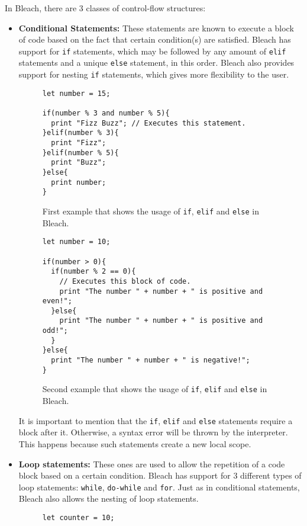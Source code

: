 In Bleach, there are 3 classes of control-flow structures:
\begin{itemize}
    \item \textbf{Conditional Statements:} These statements are known to execute a block of code based on the fact that certain condition(s) are satisfied. Bleach has support for \texttt{if} statements, which may be followed by any amount of \texttt{elif} statements and a unique \texttt{else} statement, in this order. Bleach also provides support for nesting \texttt{if} statements, which gives more flexibility to the user.
\begin{figure}[H]
    \centering
    \begin{lstlisting}
let number = 15;

if(number % 3 and number % 5){
  print "Fizz Buzz"; // Executes this statement.
}elif(number % 3){
  print "Fizz";
}elif(number % 5){
  print "Buzz";
}else{
  print number;
}
    \end{lstlisting}
    \caption{First example that shows the usage of \texttt{if}, \texttt{elif} and \texttt{else} in Bleach.}
\end{figure}

\begin{figure}[H]
    \centering
    \begin{lstlisting}
let number = 10;

if(number > 0){
  if(number % 2 == 0){
    // Executes this block of code.
    print "The number " + number + " is positive and even!";
  }else{
    print "The number " + number + " is positive and odd!";
  }
}else{
  print "The number " + number + " is negative!";
}
    \end{lstlisting}
    \caption{Second example that shows the usage of \texttt{if}, \texttt{elif} and \texttt{else} in Bleach.}
\end{figure}

    It is important to mention that the \texttt{if}, \texttt{elif} and \texttt{else} statements require a block after it. Otherwise, a syntax error will be thrown by the interpreter. This happens because such statements create a new local scope.
    
    \item \textbf{Loop statements:} These ones are used to allow the repetition of a code block based on a certain condition. Bleach has support for 3 different types of loop statements: \texttt{while}, \texttt{do-while} and \texttt{for}. Just as in conditional statements, Bleach also allows the nesting of loop statements.
\begin{figure}[H]
    \centering
    \begin{lstlisting}
let counter = 10;


\end{lstlisting}
\end{figure}
\end{itemize}
